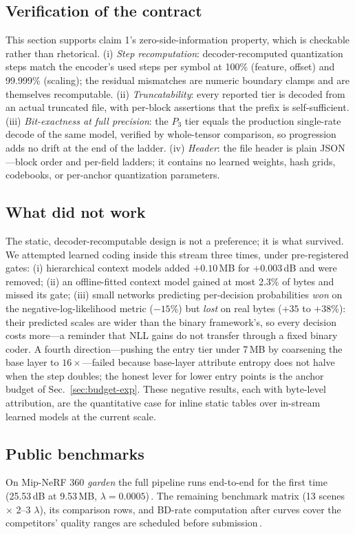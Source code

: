 \subsection{Verification of the contract}
\label{sec:verify}

This section supports claim 1's zero-side-information property, which is checkable rather than rhetorical.
(i) \emph{Step recomputation}: decoder-recomputed quantization steps match the encoder's used steps per symbol at 100\% (feature, offset) and 99.999\% (scaling); the residual mismatches are numeric boundary clamps and are themselves recomputable.
(ii) \emph{Truncatability}: every reported tier is decoded from an actual truncated file, with per-block assertions that the prefix is self-sufficient.
(iii) \emph{Bit-exactness at full precision}: the $P_3$ tier equals the production single-rate decode of the same model, verified by whole-tensor comparison, so progression adds no drift at the end of the ladder.
(iv) \emph{Header}: the file header is plain JSON---block order and per-field ladders; it contains no learned weights, hash grids, codebooks, or per-anchor quantization parameters.

\subsection{What did not work}
\label{sec:negative}

The static, decoder-recomputable design is not a preference; it is what survived.
We attempted learned coding inside this stream three times, under pre-registered gates:
(i) hierarchical context models added $+0.10$\,MB for $+0.003$\,dB and were removed;
(ii) an offline-fitted context model gained at most 2.3\% of bytes and missed its gate;
(iii) small networks predicting per-decision probabilities \emph{won} on the negative-log-likelihood metric ($-15$\%) but \emph{lost} on real bytes ($+35$ to $+38$\%): their predicted scales are wider than the binary framework's, so every decision costs more---a reminder that NLL gains do not transfer through a fixed binary coder.
A fourth direction---pushing the entry tier under 7\,MB by coarsening the base layer to $16\times$---failed because base-layer attribute entropy does not halve when the step doubles; the honest lever for lower entry points is the anchor budget of Sec.~\ref{sec:budget-exp}.
These negative results, each with byte-level attribution, are the quantitative case for inline static tables over in-stream learned models at the current scale.

\subsection{Public benchmarks}
\label{sec:stdbench}

On Mip-NeRF 360 \emph{garden} the full pipeline runs end-to-end for the first time (25.53\,dB at 9.53\,MB, $\lambda{=}0.0005$)\,.
The remaining benchmark matrix (13 scenes $\times$ 2--3 $\lambda$), its comparison rows, and BD-rate computation after curves cover the competitors' quality ranges are scheduled before submission\,.
